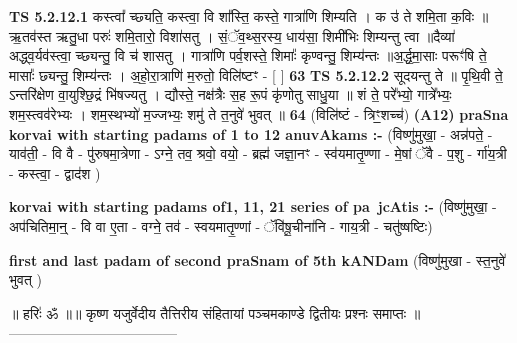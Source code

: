 \documentclass[17pt]{extarticle}
\begin{document}
                                        \textbf{ TS 5.2.12.1} \newline
                  कस्त्वा᳚ च्छ्यति॒ कस्त्वा॒ वि शा᳚स्ति॒ कस्ते॒ गात्रा॑णि शिम्यति । क उ॑ ते शमि॒ता क॒विः ॥ ऋ॒तव॑स्त ऋतु॒धा परुः॑ शमि॒तारो॒ विशा॑सतु । सं॒ॅव॒थ्स॒रस्य॒ धाय॑सा॒ शिमी॑भिः शिम्यन्तु त्वा ॥दैव्या॑ अद्ध्व॒र्यव॑स्त्वा॒ च्छ्यन्तु॒ वि च॑ शासतु । गात्रा॑णि पर्व॒शस्ते॒ शिमाः᳚ कृण्वन्तु॒ शिम्य॑न्तः ॥अ॒र्द्ध॒मा॒साः परूꣳ॑षि ते॒ मासाः᳚ छ्यन्तु॒ शिम्य॑न्तः । अ॒हो॒रा॒त्राणि॑ म॒रुतो॒ विलि॑ष्टꣳ - [  ] \textbf{  63 } \newline
                  \newline
                                \textbf{ TS 5.2.12.2} \newline
                  सूदयन्तु ते ॥ पृ॒थि॒वी ते॒ ऽन्तरि॑क्षेण वा॒युश्छि॒द्रं भि॑षज्यतु । द्यौस्ते॒ नक्ष॑त्रैः स॒ह रू॒पं कृ॑णोतु साधु॒या ॥ शं ते॒ परे᳚भ्यो॒ गात्रे᳚भ्यः॒ शम॒स्त्वव॑रेभ्यः । शम॒स्थभ्यो॑ म॒ज्जभ्यः॒ शमु॑ ते त॒नुवे॑ भुवत् ॥ \textbf{  64} \newline
                  \newline
                      (विलि॑ष्टं - त्रिꣳ॒॒शच्च॑)  \textbf{(A12)} \newline \newline
                \textbf{praSna korvai with starting padams of 1 to 12 anuvAkams :-} \newline
        (विष्णु॑मुखा॒ - अन्न॑पते॒ - याव॑ती॒ - वि वै - पु॑रुषमा॒त्रेणा - ऽग्ने॒ तव॒ श्रवो॒ वयो॒ - ब्रह्म॑ जज्ञा॒नꣳ - स्व॑यमातृ॒ण्णा - मे॒षां ॅवै - प॒शु - र्गा॑य॒त्री - कस्त्वा॒ - द्वाद॑श ) \newline

        \textbf{korvai with starting padams of1, 11, 21 series of pa~jcAtis :-} \newline
        (विष्णु॑मुखा॒ - अप॑चितिमा॒न्॒ - वि वा ए॒ता - वग्ने॒ तव॑ - स्वयमातृ॒ण्णां - ॅवि॑षू॒चीना॑नि - गाय॒त्री - चतु॑ष्षष्टिः) \newline

        \textbf{first and last padam of second praSnam of 5th kANDam} \newline
        (विष्णु॑मुखा - स्त॒नुवे॑ भुवत् ) \newline 

        
        ॥ हरिः॑ ॐ ॥॥ कृष्ण यजुर्वेदीय तैत्तिरीय संहितायां पञ्चमकाण्डे द्वितीयः प्रश्नः समाप्तः ॥
------------------------------------ \newline
        \pagebreak
                \pagebreak
        
\end{document}
